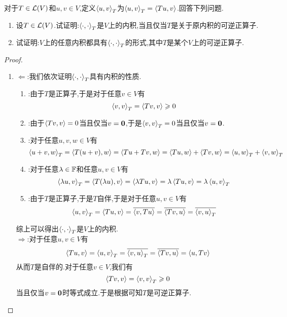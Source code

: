 \documentclass{ctexart}
\begin{document}
\begin{problem}[23.]
    对于$T\in\mathcal{L}(V)$和$u,v\in V$,定义$\left\langle{u},{v}\right\rangle_T$为$\left\langle{u},{v}\right\rangle_T=\left\langle{Tu},{v}\right\rangle$.回答下列问题.
    \begin{enumerate}[label=\tbf{(\arabic*)}]
        \item 设$T\in\mathcal{L}(V)$.试证明:$\left\langle{\cdot},{\cdot}\right\rangle_T$是$V$上的内积,当且仅当$T$是关于原内积的可逆正算子.
        \item 试证明:$V$上的任意内积都具有$\left\langle{\cdot},{\cdot}\right\rangle_T$的形式,其中$T$是某个$V$上的可逆正算子.
    \end{enumerate}
\end{problem}
\begin{proof}
    \begin{enumerate}[label=\tbf{(\arabic*)}]
        \item $\Leftarrow$:我们依次证明$\left\langle{\cdot},{\cdot}\right\rangle_T$具有内积的性质.
            \begin{enumerate}[label=\tbf{(\alph*)}]
                \item {}:由于$T$是正算子,于是对于任意$v\in V$有
                    \[\left\langle{v},{v}\right\rangle_T=\left\langle{Tv},{v}\right\rangle\geqslant0\]
                \item {}:由于$\left\langle{Tv},{v}\right\rangle=0$当且仅当$v=\mathbf0$,于是$\left\langle{v},{v}\right\rangle_T=0$当且仅当$v=\mathbf0$.
                \item {}:对于任意$u,v,w\in V$有
                    \[\left\langle{u+v},{w}\right\rangle_T=\left\langle{T(u+v)},{w}\right\rangle=\left\langle{Tu+Tv},{w}\right\rangle=\left\langle{Tu},{w}\right\rangle+\left\langle{Tv},{w}\right\rangle=\left\langle{u},{w}\right\rangle_T+\left\langle{v},{w}\right\rangle_T\]
                \item {}:对于任意$\lambda\in\mathbb{F}$和任意$u,v\in V$有
                    \[\left\langle{\lambda u},{v}\right\rangle_T=\left\langle{T(\lambda u)},{v}\right\rangle=\left\langle{\lambda Tu},{v}\right\rangle=\lambda\left\langle{Tu},{v}\right\rangle=\lambda\left\langle{u},{v}\right\rangle_T\]
                \item {}:由于$T$是正算子,于是$T$自伴,于是对于任意$u,v\in V$有
                    \[\left\langle{u},{v}\right\rangle_T=\left\langle{Tu},{v}\right\rangle=\overline{\left\langle{v},{Tu}\right\rangle}=\overline{\left\langle{Tv},{u}\right\rangle}=\overline{\left\langle{v},{u}\right\rangle_T}\]
            \end{enumerate}
            综上可以得出$\left\langle{\cdot},{\cdot}\right\rangle_T$是$V$上的内积.\\
            $\Rightarrow$:对于任意$u,v\in V$有
            \[\left\langle{Tu},{v}\right\rangle=\left\langle{u},{v}\right\rangle_T=\overline{\left\langle{v},{u}\right\rangle_T}=\overline{\left\langle{Tv},{u}\right\rangle}=\left\langle{u},{Tv}\right\rangle\]
            从而$T$是自伴的.对于任意$v\in V$,我们有
            \[\left\langle{Tv},{v}\right\rangle=\left\langle{v},{v}\right\rangle_T\geqslant0\]
            当且仅当$v=\mathbf0$时等式成立.于是根据可知$T$是可逆正算子.

\end{enumerate}
\end{proof}
\end{document}
